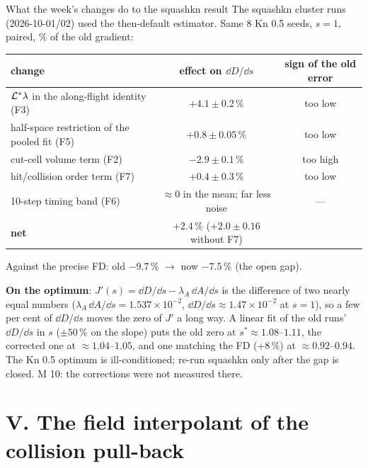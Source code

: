 \documentclass[10pt,aspectratio=169]{beamer}
\begin{document}
\begin{frame}{What the week's changes do to the squashkn result}
\footnotesize
The squashkn cluster runs (2026-10-01/02) used the then-default estimator.  Same 8 Kn 0.5 seeds,
$s = 1$, paired, \% of the old gradient:
\begin{center}
\begin{tabular}{@{}lcc@{}}
\toprule
change & effect on $\dd D/\dd s$ & sign of the old error\\
\midrule
$\mathcal L^*\lambda$ in the along-flight identity (F3) & $+4.1\pm0.2\,\%$ & too low\\
half-space restriction of the pooled fit (F5) & $+0.8\pm0.05\,\%$ & too low\\
cut-cell volume term (F2) & $-2.9\pm0.1\,\%$ & too high\\
hit/collision order term (F7) & $+0.4\pm0.3\,\%$ & too low\\
10-step timing band (F6) & $\approx0$ in the mean; far less noise & ---\\
\midrule
\textbf{net} & $\mathbf{+2.4\,\%}$ ($+2.0\pm0.16$ without F7) & \\
\bottomrule
\end{tabular}
\end{center}
Against the precise FD: old $-9.7\,\%$ $\to$ now $-7.5\,\%$ (the open gap).

\medskip
\textbf{On the optimum}: $J'(s) = \dd D/\dd s - \lambda_A\,\dd A/\dd s$ is the difference of two nearly equal
numbers ($\lambda_A\,\dd A/\dd s = 1.537\times10^{-2}$, $\dd D/\dd s\approx1.47\times10^{-2}$ at $s = 1$), so a few
per cent of $\dd D/\dd s$ moves the zero of $J'$ a long way.  A linear fit of the old runs' $\dd D/\dd s$ in $s$
($\pm50\,\%$ on the slope) puts the old zero at $s^*\approx1.08$--$1.11$, the corrected one at $\approx1.04$--$1.05$,
and one matching the FD (+8\,\%) at $\approx0.92$--$0.94$.  The Kn 0.5 optimum is ill-conditioned; re-run
squashkn only after the gap is closed.  M 10: the corrections were not measured there.
\end{frame}

\section{V. The field interpolant of the collision pull-back}
\end{document}

